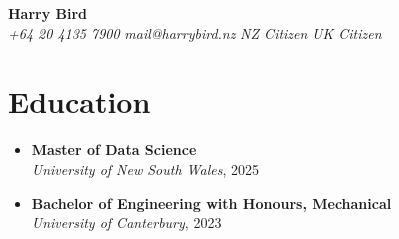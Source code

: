 \documentclass[a4paper,10pt]{article}
\begin{document}
\begin{center}
    {\Huge \textbf{Harry Bird}} \\
    \vspace{0.5cm}
    \textit{+64 20 4135 7900} 
    \textit{mail@harrybird.nz} 
    \textit{NZ Citizen} 
    \textit{UK Citizen} \\
\end{center}

\section*{Education}
\begin{itemize}
    \item \textbf{Master of Data Science} \\
    \textit{University of New South Wales}, 2025
    \item \textbf{Bachelor of Engineering with Honours, Mechanical} \\
    \textit{University of Canterbury}, 2023
\end{itemize}
\end{document}
